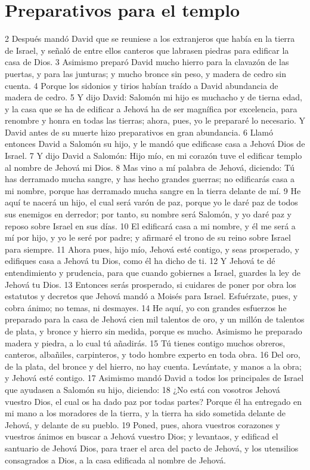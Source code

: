 \section*{Preparativos para el templo}

2 Después mandó David que se reuniese a los extranjeros que había en la tierra de Israel, y señaló de entre ellos canteros que labrasen piedras para edificar la casa de Dios.
3 Asimismo preparó David mucho hierro para la clavazón de las puertas, y para las junturas; y mucho bronce sin peso, y madera de cedro sin cuenta.
4 Porque los sidonios y tirios habían traído a David abundancia de madera de cedro.
5 Y dijo David: Salomón mi hijo es muchacho y de tierna edad, y la casa que se ha de edificar a Jehová ha de ser magnífica por excelencia, para renombre y honra en todas las tierras; ahora, pues, yo le prepararé lo necesario. Y David antes de su muerte hizo preparativos en gran abundancia.
6 Llamó entonces David a Salomón su hijo, y le mandó que edificase casa a Jehová Dios de Israel.
7 Y dijo David a Salomón: Hijo mío, en mi corazón tuve el edificar templo al nombre de Jehová mi Dios.
8 Mas vino a mí palabra de Jehová, diciendo: Tú has derramado mucha sangre, y has hecho grandes guerras; no edificarás casa a mi nombre, porque has derramado mucha sangre en la tierra delante de mí.
9 He aquí te nacerá un hijo, el cual será varón de paz, porque yo le daré paz de todos sus enemigos en derredor; por tanto, su nombre será Salomón, y yo daré paz y reposo sobre Israel en sus días.
10 El edificará casa a mi nombre, y él me será a mí por hijo, y yo le seré por padre; y afirmaré el trono de su reino sobre Israel para siempre. 
11 Ahora pues, hijo mío, Jehová esté contigo, y seas prosperado, y edifiques casa a Jehová tu Dios, como él ha dicho de ti.
12 Y Jehová te dé entendimiento y prudencia, para que cuando gobiernes a Israel, guardes la ley de Jehová tu Dios.
13 Entonces serás prosperado, si cuidares de poner por obra los estatutos y decretos que Jehová mandó a Moisés para Israel. Esfuérzate, pues, y cobra ánimo; no temas, ni desmayes. 
14 He aquí, yo con grandes esfuerzos he preparado para la casa de Jehová cien mil talentos de oro,  y un millón de talentos de plata, y bronce y hierro sin medida, porque es mucho. Asimismo he preparado madera y piedra, a lo cual tú añadirás.
15 Tú tienes contigo muchos obreros, canteros, albañiles, carpinteros, y todo hombre experto en toda obra.
16 Del oro, de la plata, del bronce y del hierro, no hay cuenta. Levántate, y manos a la obra; y Jehová esté contigo.
17 Asimismo mandó David a todos los principales de Israel que ayudasen a Salomón su hijo, diciendo:
18 ¿No está con vosotros Jehová vuestro Dios, el cual os ha dado paz por todas partes? Porque él ha entregado en mi mano a los moradores de la tierra, y la tierra ha sido sometida delante de Jehová, y delante de su pueblo.
19 Poned, pues, ahora vuestros corazones y vuestros ánimos en buscar a Jehová vuestro Dios; y levantaos, y edificad el santuario de Jehová Dios, para traer el arca del pacto de Jehová, y los utensilios consagrados a Dios, a la casa edificada al nombre de Jehová.

